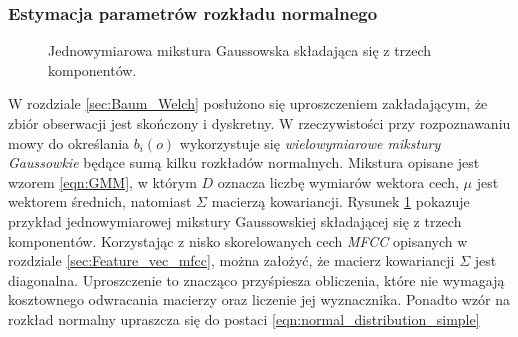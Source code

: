\documentclass[11pt]{article}
\begin{document}
	   \subsubsection{Estymacja parametrów rozkładu normalnego}
	   	   
	   \begin{figure}[H]
	   \label{fig:gmm}
	   \caption{Jednowymiarowa mikstura Gaussowska składająca się z trzech komponentów.}
	\end{figure}
	   
	   \label{sec:gmm_estimation}
	   W rozdziale \ref{sec:Baum_Welch} posłużono się uproszczeniem zakładającym, że zbiór obserwacji jest skończony i dyskretny. W rzeczywistości przy rozpoznawaniu mowy do określania $b_i(o)$ wykorzystuje się \textit{wielowymiarowe mikstury Gaussowkie} będące sumą kilku rozkładów normalnych. Mikstura opisane jest wzorem \ref{eqn:GMM}, w którym $D$ oznacza liczbę wymiarów wektora cech, $\mu$ jest wektorem średnich, natomiast $\Sigma$ macierzą kowariancji. Rysunek \ref{fig:gmm} pokazuje przykład jednowymiarowej mikstury Gaussowskiej składającej się z trzech komponentów. Korzystając z nisko skorelowanych cech \textit{MFCC} opisanych w rozdziale \ref{sec:Feature_vec_mfcc}, można założyć, że macierz kowariancji $\Sigma$ jest diagonalna. Uproszczenie to znacząco przyśpiesza obliczenia, które nie wymagają kosztownego odwracania macierzy oraz liczenie jej wyznacznika. Ponadto wzór na rozkład normalny upraszcza się do postaci \ref{eqn:normal_distribution_simple}
	   
\end{document}

